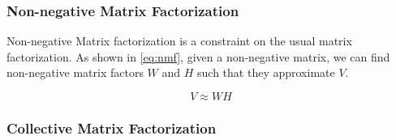 
\subsubsection{Non-negative Matrix Factorization}

Non-negative Matrix factorization is a constraint on the usual matrix factorization. As shown in \ref{eq:nmf}, given a non-negative matrix, we can find non-negative matrix factors $W$ and $H$ such that they approximate $V$.

\begin{equation} \label{eq:nmf}
	V \approx W H
\end{equation}


\subsubsection{Collective Matrix Factorization}
